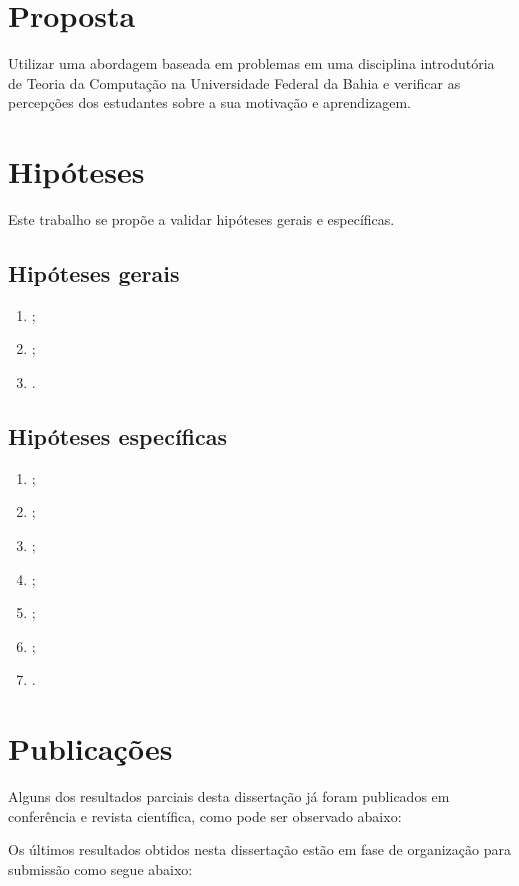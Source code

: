 \section{Proposta}
\label{sec-proposta}
Utilizar uma abordagem baseada em problemas em uma disciplina
introdutória de Teoria da Computação na Universidade Federal
da Bahia e verificar as percepções dos estudantes sobre a sua
motivação e aprendizagem.

\section{Hipóteses}
\label{sec-hipoteses}
Este trabalho se propõe a validar hipóteses gerais e específicas.

\subsection{Hipóteses gerais}
\label{sec-hipoteses-gerais}
\begin{enumerate}
\item{\label{hg1ref} \hgatexto;}
\item{\label{hg2ref} \hgbtexto;}
\item{\label{hg3ref} \hgctexto.}
\end{enumerate}

\subsection{Hipóteses específicas}
\label{sec-hipoteses-especificas}
\begin{enumerate}
\item{\label{he1ref} \heatexto;}
\item{\label{he2ref} \hebtexto;}
\item{\label{he3ref} \hectexto;}
\item{\label{he4ref} \hedtexto;}
\item{\label{he5ref} \heetexto;}
\item{\label{he6ref} \heftexto;}
\item{\label{he7ref} \hegtexto.}
\end{enumerate}

\section{Publicações}
\label{sec-publicacoes}
Alguns dos resultados parciais desta dissertação já
foram publicados em conferência e revista científica,
como pode ser observado abaixo:
\begin{itemize}

\end{itemize}
Os últimos resultados obtidos nesta dissertação estão
em fase de organização para submissão como segue abaixo:

